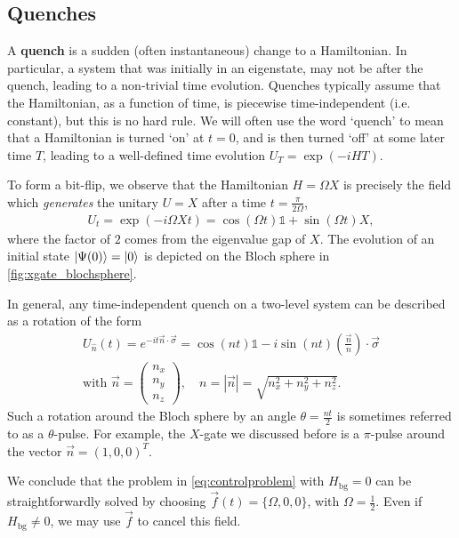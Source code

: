 \subsection{Quenches}
\label{sec:quench}

A \textbf{quench} is a sudden (often instantaneous) change to a Hamiltonian. In particular, a system that was initially in an eigenstate, may not be after the quench, leading to a non-trivial time evolution. Quenches typically assume that the Hamiltonian, as a function of time, is piecewise time-independent (i.e. constant), but this is no hard rule. We will often use the word `quench' to mean that a Hamiltonian is turned `on' at $t=0$, and is then turned `off' at some later time $T$, leading to a well-defined time evolution $U_T = \exp( -i H T)$. 
%

To form a bit-flip, we observe that the Hamiltonian $H = \Omega X$ is precisely the field which \emph{generates} the unitary $U = X$ after a time $t = \frac{\pi}{2 \Omega}$,
\begin{align*}
U_{t} = \exp(-i \Omega X t ) = \cos( \Omega t ) \mathds{1} + \sin( \Omega t ) X,
\end{align*}
where the factor of $2$ comes from the eigenvalue gap of $X$. The evolution of an initial state $\lvert\Psi(0)\rangle = \lvert0\rangle$ is depicted on the Bloch sphere in \cref{fig:xgate_blochsphere}. 

In general, any time-independent quench on a two-level system can be described as a rotation of the form
\begin{align}
U_{\hat{n}}(t) = e^{-i t \vec{n} \cdot \vec{\sigma} } = \cos( n t ) \mathds{1} - i \sin( n t ) \left( \frac{ \vec{n} }{n} \right) \cdot \vec{\sigma}  \label{eqn:tlsrot} \\
\text{with } \vec{n} = \begin{pmatrix} n_x \\ n_y \\ n_z \end{pmatrix}, 
\quad n = | \vec{n} | = \sqrt{ n_x^2 + n_y^2 + n_z^2 }. \nonumber
\end{align}
Such a rotation around the Bloch sphere by an angle $\theta = \frac{n t}{2}$ is sometimes referred to as a $\theta
$-pulse. For example, the $X$-gate we discussed before is a $\pi$-pulse around the vector $\vec{n} = (1,0,0)^T$. 

We conclude that the problem in \cref{eq:controlproblem} with $H_\text{bg} = 0$ can be straightforwardly solved by choosing $\vec{f}(t) = \{ \Omega, 0, 0 \}$, with $\Omega = \frac{1}{2}$. 
Even if $H_\text{bg} \neq 0$, we may use $\vec{f}$ to cancel this field. 



